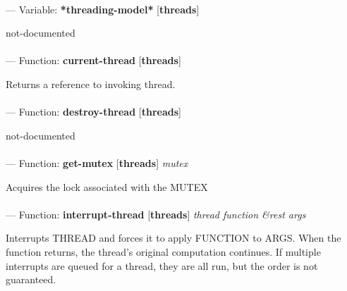 \paragraph{}
\label{THREADS:*THREADING-MODEL*}
--- Variable: \textbf{*threading-model*} [\textbf{threads}] \textit{}

\begin{adjustwidth}{5em}{5em}
not-documented
\end{adjustwidth}

\paragraph{}
\label{THREADS:CURRENT-THREAD}
--- Function: \textbf{current-thread} [\textbf{threads}] \textit{}

\begin{adjustwidth}{5em}{5em}
Returns a reference to invoking thread.
\end{adjustwidth}

\paragraph{}
\label{THREADS:DESTROY-THREAD}
--- Function: \textbf{destroy-thread} [\textbf{threads}] \textit{}

\begin{adjustwidth}{5em}{5em}
not-documented
\end{adjustwidth}

\paragraph{}
\label{THREADS:GET-MUTEX}
--- Function: \textbf{get-mutex} [\textbf{threads}] \textit{mutex}

\begin{adjustwidth}{5em}{5em}
Acquires the lock associated with the MUTEX
\end{adjustwidth}

\paragraph{}
\label{THREADS:INTERRUPT-THREAD}
--- Function: \textbf{interrupt-thread} [\textbf{threads}] \textit{thread function \&rest args}

\begin{adjustwidth}{5em}{5em}
Interrupts THREAD and forces it to apply FUNCTION to ARGS.
When the function returns, the thread's original computation continues. If  multiple interrupts are queued for a thread, they are all run, but the order is not guaranteed.
\end{adjustwidth}

